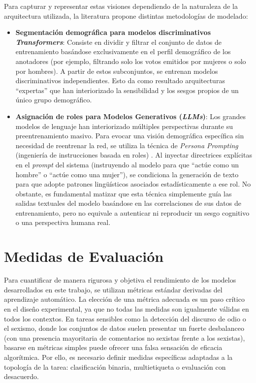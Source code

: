 Para capturar y representar estas visiones dependiendo de la naturaleza de la arquitectura utilizada, la literatura propone distintas metodologías de modelado: 
\begin{itemize}
    \item \textbf{Segmentación demográfica para modelos discriminativos \textit{Transformers}}: Consiste en dividir y filtrar el conjunto de datos de entrenamiento basándose exclusivamente en el perfil demográfico de los anotadores (por ejemplo, filtrando solo los votos emitidos por mujeres o solo por hombres). A partir de estos subconjuntos, se entrenan modelos discriminativos independientes. Esto da como resultado arquitecturas ``expertas'' que han interiorizado la sensibilidad y los sesgos propios de un único grupo demográfico.  
    \item \textbf{Asignación de roles para Modelos Generativos (\textit{LLMs})}: Los grandes modelos de lenguaje han interiorizado múltiples perspectivas durante su preentrenamiento masivo. Para evocar una visión demográfica específica sin necesidad de reentrenar la red, se utiliza la técnica de \textit{Persona Prompting} (ingeniería de instrucciones basada en roles) \cite{deshpande2023toxicity}. Al inyectar directrices explícitas en el \textit{prompt} del sistema (instruyendo al modelo para que ``actúe como un hombre'' o ``actúe como una mujer''), se condiciona la generación de texto para que adopte patrones lingüísticos asociados estadísticamente a ese rol. No obstante, es fundamental matizar que esta técnica simplemente guía las salidas textuales del modelo basándose en las correlaciones de sus datos de entrenamiento, pero no equivale a autenticar ni reproducir un sesgo cognitivo o una perspectiva humana real. 
\end{itemize}

\section{Medidas de Evaluación}
\label{sec:Evaluacion}
Para cuantificar de manera rigurosa y objetiva el rendimiento de los modelos desarrollados en este trabajo, se utilizan métricas estándar derivadas del aprendizaje automático. La elección de una métrica adecuada es un paso crítico en el diseño experimental, ya que no todas las medidas son igualmente válidas en todos los contextos. En tareas sensibles como la detección del discurso de odio o el sexismo, donde los conjuntos de datos suelen presentar un fuerte desbalanceo (con una presencia mayoritaria de comentarios no sexistas frente a los sexistas), basarse en métricas simples puede ofrecer una falsa sensación de eficacia algorítmica. Por ello, es necesario definir medidas específicas adaptadas a la topología de la tarea: clasificación binaria, multietiqueta o evaluación con desacuerdo. 

